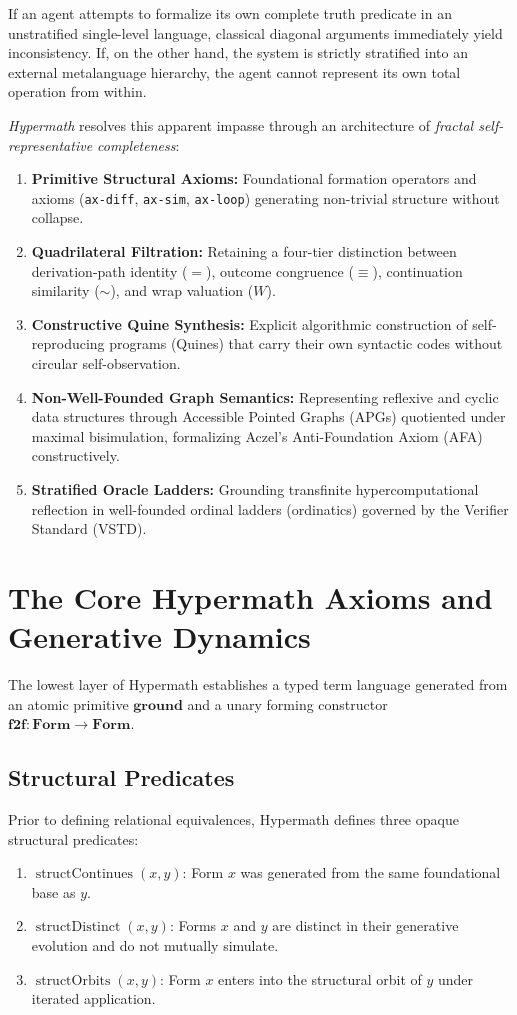 \documentclass[11pt]{article}
\theoremstyle{definition}
\begin{document}
If an agent attempts to formalize its own complete truth predicate in an unstratified single-level language, classical diagonal arguments immediately yield inconsistency. If, on the other hand, the system is strictly stratified into an external metalanguage hierarchy, the agent cannot represent its own total operation from within.

\emph{Hypermath} resolves this apparent impasse through an architecture of \emph{fractal self-representative completeness}:
\begin{enumerate}
\item \textbf{Primitive Structural Axioms:} Foundational formation operators and axioms (\texttt{ax-diff}, \texttt{ax-sim}, \texttt{ax-loop}) generating non-trivial structure without collapse.
\item \textbf{Quadrilateral Filtration:} Retaining a four-tier distinction between derivation-path identity ($=$), outcome congruence ($\equiv$), continuation similarity ($\sim$), and wrap valuation ($W$).
\item \textbf{Constructive Quine Synthesis:} Explicit algorithmic construction of self-reproducing programs (Quines) that carry their own syntactic codes without circular self-observation.
\item \textbf{Non-Well-Founded Graph Semantics:} Representing reflexive and cyclic data structures through Accessible Pointed Graphs (APGs) quotiented under maximal bisimulation, formalizing Aczel's Anti-Foundation Axiom (AFA) constructively.
\item \textbf{Stratified Oracle Ladders:} Grounding transfinite hypercomputational reflection in well-founded ordinal ladders (ordinatics) governed by the Verifier Standard (VSTD).
\end{enumerate}

\section{The Core Hypermath Axioms and Generative Dynamics}
The lowest layer of Hypermath establishes a typed term language generated from an atomic primitive $\mathbf{ground}$ and a unary forming constructor $\mathbf{f2f} \colon \mathbf{Form} \to \mathbf{Form}$. 

\subsection{Structural Predicates}
Prior to defining relational equivalences, Hypermath defines three opaque structural predicates:
\begin{enumerate}
\item $\operatorname{structContinues}(x, y)$: Form $x$ was generated from the same foundational base as $y$.
\item $\operatorname{structDistinct}(x, y)$: Forms $x$ and $y$ are distinct in their generative evolution and do not mutually simulate.
\item $\operatorname{structOrbits}(x, y)$: Form $x$ enters into the structural orbit of $y$ under iterated application.
\end{enumerate}
\end{document}
